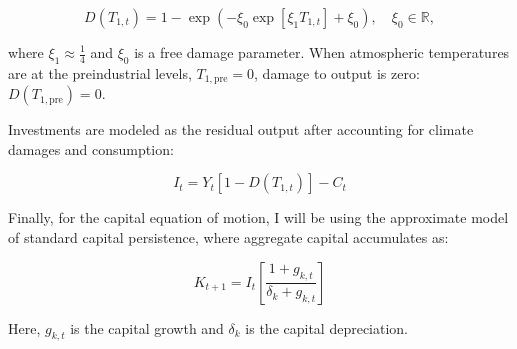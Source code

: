 \begin{equation}
    D(T_{1,t}) = 1 - \exp(-\xi_0 \exp[\xi_1 T_{1,t}] + \xi_0), \quad \xi_0 \in \mathbb{R},
\end{equation}

where \(\xi_1\approx \frac{1}{4}\) and \(\xi_0\) is a free damage parameter. When atmospheric temperatures are at the preindustrial levels, \(T_{1,\text{pre}}=0\), damage to output is zero: \(D(T_{1,\text{pre}}) = 0\). 

Investments are modeled as the residual output after accounting for climate damages and consumption:

\begin{equation}
    I_t=Y_t \left[ 1-D(T_{1,t}) \right] - C_t
\label{eq:investments}
\end{equation}

Finally, for the capital equation of motion, I will be using the approximate model of standard capital persistence, where aggregate capital accumulates as:

\begin{equation}
    K_{t+1} = I_t\left[\frac{1+g_{k,t}}{\delta_k + g_{k,t}} \right]
\end{equation}

Here, \(g_{k,t}\) is the capital growth and \(\delta_k\) is the capital depreciation.
